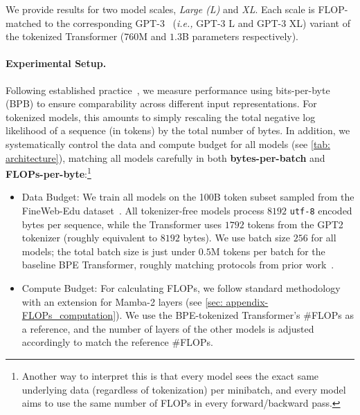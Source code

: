 \documentclass{article}
\newcommand{\citep}{\parencite}
\newcommand{\ie}{\emph{i.e.,}}
\theoremstyle{plain}
\theoremstyle{remark}
\begin{document}
We provide results for two model scales, \emph{Large (L)} and \emph{XL}.
Each scale is FLOP-matched to the corresponding GPT-3~\citep{GPT3} (\ie{} GPT-3 L and GPT-3 XL) variant of the tokenized Transformer ($760$M and $1.3$B parameters respectively).

\paragraph{Experimental Setup.}

Following established practice~\citep{ByT5, MambaByte, SpaceByte}, we measure performance using bits-per-byte (BPB) to ensure comparability across different input representations.
For tokenized models, this amounts to simply rescaling the total negative log likelihood of a sequence (in tokens) by the total number of bytes.
In addition, we systematically control the data and compute budget for all models (see \cref{tab: architecture}),
matching all models carefully in both \textbf{bytes-per-batch} and \textbf{FLOPs-per-byte}:\footnote{Another way to interpret this is that every model sees the exact same underlying data (regardless of tokenization) per minibatch, and every model aims to use the same number of FLOPs in every forward/backward pass.}
\begin{itemize}

    \item Data Budget: We train all models on the 100B token subset sampled from the FineWeb-Edu dataset~\citep{FineWeb-Edu}.
    All tokenizer-free models process $8192$ \texttt{utf-8} encoded bytes per sequence, while the Transformer uses $1792$ tokens from the GPT2 tokenizer (roughly equivalent to $8192$ bytes).
    We use batch size $256$ for all models; the total batch size is just under $0.5$M tokens per batch for the baseline BPE Transformer, roughly matching protocols from prior work~\citep{Mamba}.
    
    \item Compute Budget: For calculating FLOPs, we follow standard methodology~\citep{Chinchilla} with an extension for Mamba-2 layers (see \cref{sec: appendix-FLOPs_computation}).
    We use the BPE-tokenized Transformer's \#FLOPs as a reference, and the number of layers of the other models is adjusted accordingly to match the reference \#FLOPs.
\end{itemize}
\end{document}
